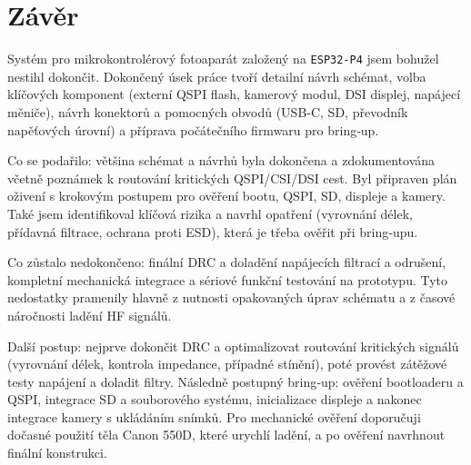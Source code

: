 \documentclass[12pt, a4paper, oneside]{report}
\begin{document}
\chapter*{Závěr}
  Systém pro mikrokontrolérový fotoaparát založený na \texttt{ESP32-P4} jsem bohužel nestihl dokončit. Dokončený úsek práce tvoří detailní návrh schémat, volba klíčových komponent (externí QSPI flash, kamerový modul, DSI displej, napájecí měniče), návrh konektorů a pomocných obvodů (USB‑C, SD, převodník napěťových úrovní) a příprava počátečního firmwaru pro bring‑up.

    Co se podařilo: většina schémat a návrhů byla dokončena a zdokumentována včetně poznámek k routování kritických QSPI/CSI/DSI cest. Byl připraven plán oživení s krokovým postupem pro ověření bootu, QSPI, SD, displeje a kamery. Také jsem identifikoval klíčová rizika a navrhl opatření (vyrovnání délek, přídavná filtrace, ochrana proti ESD), která je třeba ověřit při bring‑upu.

    Co zůstalo nedokončeno: finální DRC a doladění napájecích filtrací a odrušení, kompletní mechanická integrace a sériové funkční testování na prototypu. Tyto nedostatky pramenily hlavně z nutnosti opakovaných úprav schématu a z časové náročnosti ladění HF signálů.

    Další postup: nejprve dokončit DRC a optimalizovat routování kritických signálů (vyrovnání délek, kontrola impedance, případné stínění), poté provést zátěžové testy napájení a doladit filtry. Následně postupný bring‑up: ověření bootloaderu a QSPI, integrace SD a souborového systému, inicializace displeje a nakonec integrace kamery s ukládáním snímků. Pro mechanické ověření doporučuji dočasné použití těla Canon 550D, které urychlí ladění, a po ověření navrhnout finální konstrukci.
\end{document}
